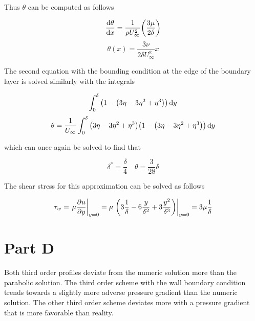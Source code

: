 \documentclass{report}
\begin{document}
Thus $\theta$ can be computed as follows

\begin{equation}
   \dv{\theta}{x} = \frac{1}{\rho U^2_{\infty}}\qty(\frac{3\mu}{2\delta})
\end{equation}
\begin{equation}
   \theta(x) = \frac{3\nu}{2\delta U^2_{\infty}}x
\end{equation}

The second equation with the bounding condition at the edge of the boundary layer is solved similarly with the integrals

\begin{equation}
   \int_{0}^{\delta}\qty(1-\qty(3\eta-3\eta^2+\eta^3))\dd{y}
\end{equation}
\begin{equation}
   \theta = \frac{1}{U_{\infty}}\int_{0}^{\delta}\qty(3\eta-3\eta^2+\eta^3)\qty(1-\qty(3\eta-3\eta^2+\eta^3))\dd{y}
\end{equation}

which can once again be solved to find that

\begin{equation}
   \delta^* = \frac{\delta}{4} \quad \theta = \frac{3}{28}\delta
\end{equation}

The shear stress for this approximation can be solved as follows

\begin{equation}
   \tau_w = \eval{\mu\pdv{u}{y}}_{y=0} = \mu \eval{\qty(3\frac{1}{\delta}-6\frac{y}{\delta^2}+3\frac{y^2}{\delta^3})}_{y=0} = 3\mu\frac{1}{\delta}
\end{equation}

\section{Part D}

Both third order profiles deviate from the numeric solution more than the parabolic solution.
The third order scheme with the wall boundary condition trends towards a slightly more adverse pressure gradient than the numeric solution.
The other third order scheme deviates more with a pressure gradient that is more favorable than reality.
\end{document}
